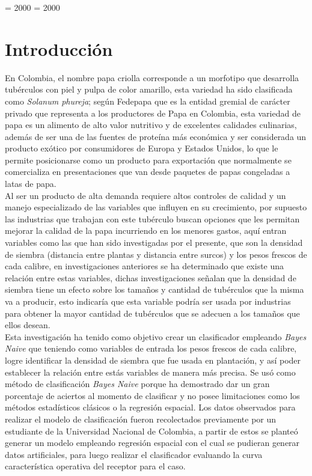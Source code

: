 
\righthyphenmin = 2000
\lefthyphenmin = 2000

\chapter*{Introducci\'on}

En Colombia, el nombre papa criolla corresponde a un morfotipo que desarrolla tubérculos
con piel y pulpa de color amarillo, esta variedad ha sido clasificada como
\textit{Solanum phureja}; según Fedepapa que es la entidad gremial de carácter privado que
representa a los productores de Papa en Colombia, esta variedad de papa es un alimento de
alto valor nutritivo y de excelentes calidades culinarias, además de ser una de las fuentes
de proteína más económica y ser considerada un producto exótico por consumidores de Europa
 y Estados Unidos, lo que le permite posicionarse como un producto para exportación que
 normalmente se comercializa en presentaciones que van desde paquetes de papas congeladas
  a latas de papa.\\

Al ser un producto de alta demanda requiere altos controles de calidad  y un  manejo
especializado de las variables que influyen en su crecimiento, por supuesto las industrias
que trabajan con este tubérculo buscan opciones que les permitan mejorar la calidad de la
papa incurriendo en los menores gastos, aquí entran variables como las que han sido
investigadas por el presente, que son la densidad de siembra (distancia entre plantas
y distancia entre surcos) y los pesos frescos de cada calibre, en investigaciones
anteriores se ha determinado que existe una relación entre estas variables, dichas
investigaciones señalan que la densidad de siembra tiene un efecto sobre los tamaños y
cantidad de tubérculos que la misma va a producir, esto indicaría que esta variable
podría ser usada por industrias para obtener la mayor cantidad de tubérculos que se
adecuen a los tamaños que ellos desean. \\

Esta investigación ha tenido como objetivo crear un clasificador empleando \textit{Bayes Naive}
 que teniendo como variables de entrada los pesos frescos de cada
 calibre, logre identificar  la densidad de siembra que
 fue usada en plantación, y así poder establecer la relación entre estás variables
 de manera más precisa. Se usó como método de clasificación \textit{Bayes Naive}
 porque ha demostrado dar un gran porcentaje de aciertos al momento de clasificar y no
 posee limitaciones como los métodos estadísticos clásicos o la regresión espacial.
 Los datos observados para realizar el modelo de clasificación fueron recolectados
 previamente por un estudiante de la Universidad Nacional de Colombia, a partir de
 estos se planteó generar un modelo empleando regresión espacial con el cual se pudieran
 generar datos artificiales, para luego realizar el clasificador evaluando la curva
 característica operativa del receptor para el caso.\\

